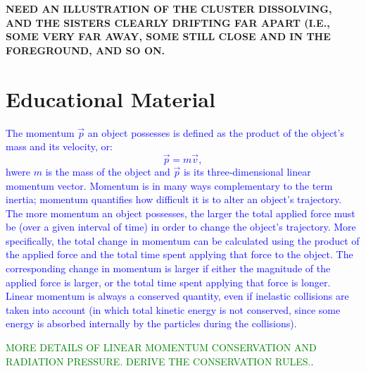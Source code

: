 \documentclass[main.tex]{subfiles}
\begin{document}
\textbf{NEED AN ILLUSTRATION OF THE CLUSTER DISSOLVING, AND THE SISTERS CLEARLY DRIFTING FAR APART (I.E., SOME VERY FAR AWAY, SOME STILL CLOSE AND IN THE FOREGROUND, AND SO ON.}

\section{Educational Material}

\begin{tcolorbox}[sharp corners, colback=blue!30, colframe=blue!80!blue, title=Linear Momentum I$^1$]
\par \textcolor{blue} {The momentum $\vec{p}$ an object possesses is defined as the product of the object's mass and its velocity, or:
\begin{equation}
\vec{p} = m\vec{v},
\end{equation}
hwere $m$ is the mass of the object and $\vec{p}$ is its three-dimensional linear momentum vector.  Momentum is in many ways complementary to the term inertia; momentum quantifies how difficult it is to alter an object's trajectory.  The more momentum an object possesses, the larger the total applied force must be (over a given interval of time) in order to change the object's trajectory.  More specifically, the total change in momentum can be calculated using the product of the applied force and the total time spent applying that force to the object.  The corresponding change in momentum is larger if either the magnitude of the applied force is larger, or the total time spent applying that force is longer.  Linear momentum is always a conserved quantity, even if inelastic collisions are taken into account (in which total kinetic energy is not conserved, since some energy is absorbed internally by the particles during the collisions)}.  
\end{tcolorbox}

\begin{tcolorbox}[sharp corners, colback=green!30, colframe=green!80!blue, title=Linear Momentum II$^2$]
\par \textcolor{green} {MORE DETAILS OF LINEAR MOMENTUM CONSERVATION AND RADIATION PRESSURE. DERIVE THE CONSERVATION RULES.}.  
\end{tcolorbox}
\end{document}
